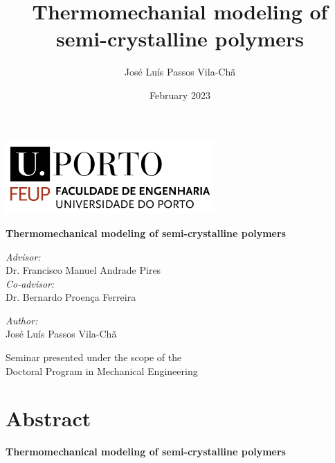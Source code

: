 \documentclass[a4paper, openright, twoside]{report}
\title{Thermomechanial modeling of semi-crystalline polymers}
\author{José Luís Passos Vila-Chã}
\date{February 2023}
\begin{document}
\begin{titlepage}
\thispagestyle{firststyle}
\begin{center}
   \begin{minipage}[c][10cm][l]{0.9\textwidth}

        \includegraphics[width=0.6\textwidth]{figures/university}

        \vspace{3.5cm}
        \huge
       \textbf{Thermomechanical modeling of semi-crystalline polymers}

       \vspace{1.5cm}
        \small
       \textit{Advisor:}\\
       \normalsize
       Dr. Francisco Manuel Andrade Pires 	 	\\
       \small
       \textit{Co-advisor:}\\
       \normalsize
       Dr. Bernardo Proença Ferreira\\

       \vspace{0.3cm}


         \small
        \textit{Author:}\\
        \vspace{0.5cm}
       \normalsize
       \!José Luís Passos Vila-Chã
       \vspace{7.5cm}


        \centering
        \small
       Seminar presented under the scope of the\\ Doctoral Program in Mechanical Engineering

   \end{minipage}
   \end{center}
\end{titlepage}

\newpage\null\thispagestyle{blank}\newpage
\chapter*{Abstract}

\textbf{Thermomechanical modeling of semi-crystalline polymers}\\
\smallskip
\end{document}
